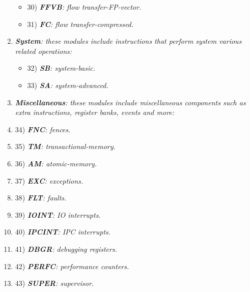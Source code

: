 \begin{enumerate}
\begin{itemize}
                \item 30) \textit{\textbf{FFVB}: flow transfer-FP-vector.}

                \item 31) \textit{\textbf{FC}: flow transfer-compressed.}

            \end{itemize}

        \item \textit{\textbf{System}: these modules include instructions that perform system various related operations:}

            \begin{itemize}

                \item 32) \textit{\textbf{SB}: system-basic.}
                \item 33) \textit{\textbf{SA}: system-advanced.}

            \end{itemize}

        \item \textit{\textbf{Miscellaneous}: these modules include miscellaneous components such as extra instructions, register banks, events and more:}

        \item 34) \textit{\textbf{FNC}: fences.}
        \item 35) \textit{\textbf{TM}: transactional-memory.}
        \item 36) \textit{\textbf{AM}: atomic-memory.}

        \item 37) \textit{\textbf{EXC}: exceptions.}
        \item 38) \textit{\textbf{FLT}: faults.}
        \item 39) \textit{\textbf{IOINT}: IO interrupts.}           
        \item 40) \textit{\textbf{IPCINT}: IPC interrupts.}

        \item 41) \textit{\textbf{DBGR}: debugging registers.}
        \item 42) \textit{\textbf{PERFC}: performance counters.}

        \item 43) \textit{\textbf{SUPER}: supervisor.}

        \end{enumerate}

